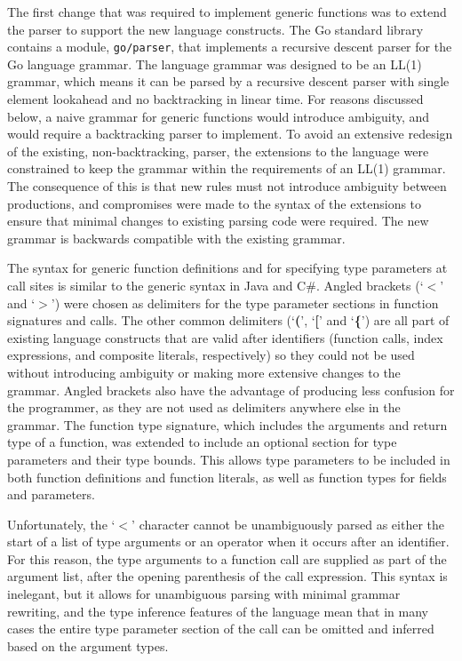 \documentclass[letterpaper,11pt]{article}
\begin{document}
The first change that was required to implement generic functions was to extend the parser to support the new language constructs. The Go standard library contains a module, \texttt{go/parser}, that implements a recursive descent parser for the Go language grammar. The language grammar was designed to be an LL(1) grammar, which means it can be parsed by a recursive descent parser with single element lookahead and no backtracking in linear time. For reasons discussed below, a naive grammar for generic functions would introduce ambiguity, and would require a backtracking parser to implement. To avoid an extensive redesign of the existing, non-backtracking, parser, the extensions to the language were constrained to keep the grammar within the requirements of an LL(1) grammar. The consequence of this is that new rules must not introduce ambiguity between productions, and compromises were made to the syntax of the extensions to ensure that minimal changes to existing parsing code were required. The new grammar is backwards compatible with the existing grammar.

The syntax for generic function definitions and for specifying type parameters at call sites is similar to the generic syntax in Java and C\#. Angled brackets (`\textbf{$<$}' and `\textbf{$>$}') were chosen as delimiters for the type parameter sections in function signatures and calls. The other common delimiters (`\textbf{(}', `\textbf{[}' and `\textbf{\{}') are all part of existing language constructs that are valid after identifiers (function calls, index expressions, and composite literals, respectively) so they could not be used without introducing ambiguity or making more extensive changes to the grammar. Angled brackets also have the advantage of producing less confusion for the programmer, as they are not used as delimiters anywhere else in the grammar. The function type signature, which includes the arguments and return type of a function, was extended to include an optional section for type parameters and their type bounds. This allows type parameters to be included in both function definitions and function literals, as well as function types for fields and parameters.

Unfortunately, the `\textbf{$<$}' character cannot be unambiguously parsed as either the start of a list of type arguments or an operator when it occurs after an identifier. For this reason, the type arguments to a function call are supplied as part of the argument list, after the opening parenthesis of the call expression. This syntax is inelegant, but it allows for unambiguous parsing with minimal grammar rewriting, and the type inference features of the language mean that in many cases the entire type parameter section of the call can be omitted and inferred based on the argument types.
\end{document}
